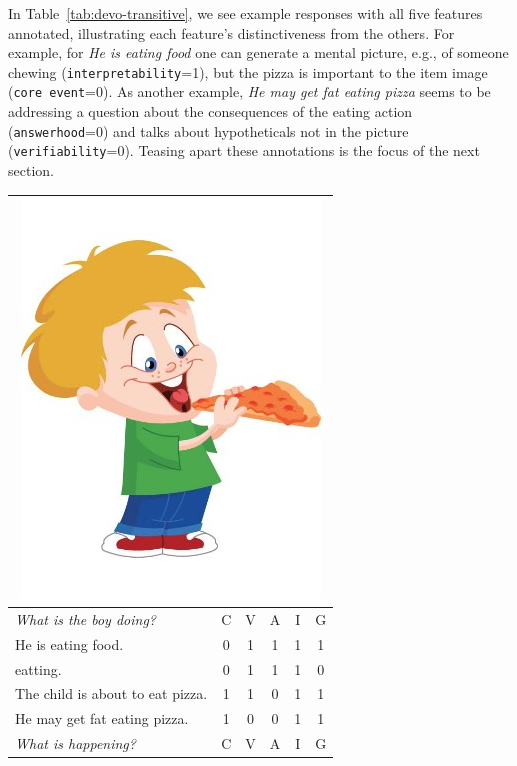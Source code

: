 \documentclass[11pt,a4paper]{article}
\newcommand{\feat}[1]{\texttt{#1}}
\begin{document}
In Table~\ref{tab:devo-transitive}, we see example responses with all five features annotated, illustrating each feature's distinctiveness from the others.  For example, for \textit{He is eating food} one can generate a mental picture, e.g., of someone chewing (\feat{interpretability}=1), but the pizza is important to the item image (\feat{core event}=0).  As another example, \textit{He may get fat eating pizza} seems to be addressing a question about the consequences of the eating action (\feat{answerhood}=0) and talks about hypotheticals not in the picture (\feat{verifiability}=0).
Teasing apart these annotations is the focus of the next section.

\begin{table}[htb!]
\begin{center}
\begin{tabular}{|p{3.7cm}|c|c|c|c|c|}
\hline
\multicolumn{6}{|c|}{\includegraphics[width=0.45\columnwidth]{figures/I02.jpg}} \\
\hline
\textit{What is the boy doing?} & C & V & A & I & G \\
\hline
\hline
He is eating food. & 0 & 1 & 1 & 1 & 1 \\
\hline
eatting. & 0 & 1 & 1 & 1 & 0 \\
\hline
The child is about to eat pizza. & 1 & 1 & 0 & 1 & 1 \\
\hline
He may get fat eating pizza. & 1 & 0 & 0 & 1 & 1 \\
\hline
\hline
\hline
\textit{What is happening?} & C & V & A & I & G \\

\end{tabular}
\end{center}
\end{table}
\end{document}
